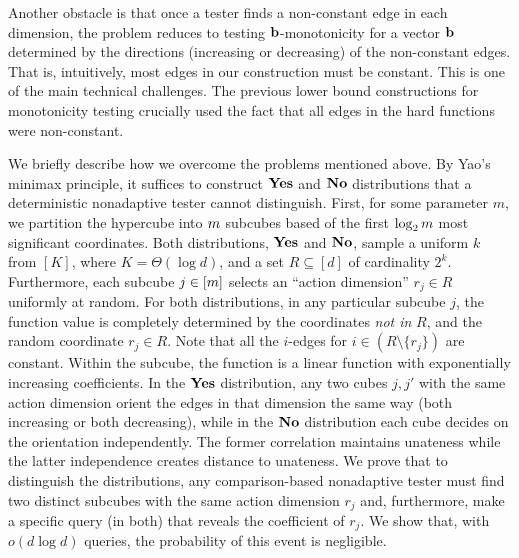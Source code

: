 Another obstacle is that once a tester finds a non-constant edge in each dimension, the problem reduces to testing $\mathbf{b}$-monotonicity for a vector $\mathbf{b}$ determined by the directions (increasing or decreasing) of the non-constant edges. That is, intuitively, most edges in our construction must be constant. This is one of the main technical challenges. The previous lower bound constructions for monotonicity testing \cite{BBM12,CS14} crucially used the fact that all edges in the hard functions were non-constant.

We briefly describe how we overcome the problems mentioned above.
By Yao's minimax principle, it suffices to construct $\mathbf{Yes}$ and $\mathbf {No}$ distributions that
a deterministic nonadaptive tester cannot distinguish.
First, for some parameter $m$, we partition the hypercube into $m$ subcubes based of the first $\log_2m$ most significant coordinates.
Both distributions, $\mathbf{Yes}$ and $\mathbf {No}$, sample a uniform $k$ from $[K]$, where $K=\Theta(\log d)$, and a set $R\subseteq[d]$ of cardinality $2^k$.
Furthermore, each subcube $j\in [m]$ selects an ``action dimension'' $r_j\in R$ uniformly at random. For both distributions, in any particular subcube $j$, the function value is completely determined by the coordinates {\em not in} $R$, and the random coordinate $r_j\in R$. Note that all the $i$-edges for $i\in (R\setminus \{r_j\})$ are constant.
Within the subcube, the function is a linear function
with exponentially increasing coefficients.
In the $\mathbf{Yes}$ distribution, any two cubes $j,j'$ with the same action dimension orient the edges in that dimension the same  way (both increasing or both decreasing), while in the $\mathbf {No}$ distribution each cube decides on the orientation independently.
The former correlation maintains unateness while the  latter independence creates distance to unateness.
We prove that to distinguish the distributions,
any comparison-based nonadaptive tester must find two distinct subcubes
with the same action dimension $r_j$ and, furthermore, make a specific
query (in both) that reveals the coefficient of $r_j$.
We show that, with $o(d\log d)$ queries, the probability of this event is negligible.

